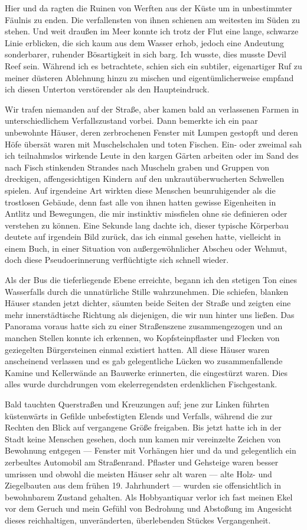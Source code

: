 Hier und da ragten die Ruinen von Werften aus der Küste um in unbestimmter Fäulnis zu enden. Die verfallensten von ihnen schienen am weitesten im Süden zu stehen. Und weit draußen im Meer konnte ich trotz der Flut eine lange, schwarze Linie erblicken, die sich kaum aus dem Wasser erhob, jedoch eine Andeutung sonderbarer, ruhender Bösartigkeit in sich barg. Ich wusste, dies musste Devil Reef sein. Während ich es betrachtete, schien sich ein subtiler, eigenartiger Ruf zu meiner düsteren Ablehnung hinzu zu mischen und eigentümlicherweise empfand ich diesen Unterton verstörender als den Haupteindruck.

Wir trafen niemanden auf der Straße, aber kamen bald an verlassenen Farmen in unterschiedlichem Verfallszustand vorbei. Dann bemerkte ich ein paar unbewohnte Häuser, deren zerbrochenen Fenster mit Lumpen gestopft und deren Höfe übersät waren mit Muschelschalen und toten Fischen. Ein- oder zweimal sah ich teilnahmslos wirkende Leute in den kargen Gärten arbeiten oder im Sand des nach Fisch stinkenden Strandes nach Muscheln graben und Gruppen von dreckigen, affengesichtigen Kindern auf den unkrautüberwucherten Schwellen spielen. Auf irgendeine Art wirkten diese Menschen beunruhigender als die trostlosen Gebäude, denn fast alle von ihnen hatten gewisse Eigenheiten in Antlitz und Bewegungen, die mir instinktiv missfielen ohne sie definieren oder verstehen zu können. Eine Sekunde lang dachte ich, dieser typische Körperbau deutete auf irgendein Bild zurück, das ich einmal gesehen hatte, vielleicht in einem Buch, in einer Situation von außergewöhnlicher Abscheu oder Wehmut, doch diese Pseudoerinnerung verflüchtigte sich schnell wieder.

Als der Bus die tieferliegende Ebene erreichte, begann ich den stetigen Ton eines Wasserfalls durch die unnatürliche Stille wahrzunehmen. Die schiefen, blanken Häuser standen jetzt dichter, säumten beide Seiten der Straße und zeigten eine mehr innerstädtische Richtung als diejenigen, die wir nun hinter uns ließen. Das Panorama voraus hatte sich zu einer Straßenszene zusammengezogen und an manchen Stellen konnte ich erkennen, wo Kopfsteinpflaster und Flecken von geziegelten Bürgersteinen einmal existiert hatten. All diese Häuser waren anscheinend verlassen und es gab gelegentliche Lücken wo zusammenfallende Kamine und Kellerwände an Bauwerke erinnerten, die eingestürzt waren. Dies alles wurde durchdrungen vom ekelerregendsten erdenklichen Fischgestank.

Bald tauchten Querstraßen und Kreuzungen auf; jene zur Linken führten küstenwärts in Gefilde unbefestigten Elends und Verfalls, während die zur Rechten den Blick auf vergangene Größe freigaben. Bis jetzt hatte ich in der Stadt keine Menschen gesehen, doch nun kamen mir vereinzelte Zeichen von Bewohnung entgegen --- Fenster mit Vorhängen hier und da und gelegentlich ein zerbeultes Automobil am Straßenrand. Pflaster und Gehsteige waren besser umrissen und obwohl die meisten Häuser sehr alt waren --- alte Holz- und Ziegelbauten aus dem frühen 19. Jahrhundert --- wurden sie offensichtlich in bewohnbarem Zustand gehalten. Als Hobbyantiquar verlor ich fast meinen Ekel vor dem Geruch und mein Gefühl von Bedrohung und Abstoßung im Angesicht dieses reichhaltigen, unveränderten, überlebenden Stückes Vergangenheit.

